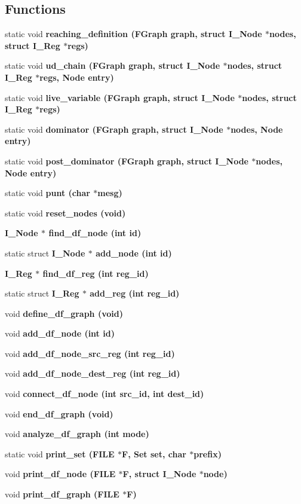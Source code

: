 \subsection*{Functions}
\begin{CompactItemize}
\item 
static void \bf{reaching\_\-definition} (\bf{FGraph} \bf{graph}, struct \bf{I\_\-Node} $\ast$\bf{nodes}, struct \bf{I\_\-Reg} $\ast$\bf{regs})
\item 
static void \bf{ud\_\-chain} (\bf{FGraph} \bf{graph}, struct \bf{I\_\-Node} $\ast$\bf{nodes}, struct \bf{I\_\-Reg} $\ast$\bf{regs}, \bf{Node} \bf{entry})
\item 
static void \bf{live\_\-variable} (\bf{FGraph} \bf{graph}, struct \bf{I\_\-Node} $\ast$\bf{nodes}, struct \bf{I\_\-Reg} $\ast$\bf{regs})
\item 
static void \bf{dominator} (\bf{FGraph} \bf{graph}, struct \bf{I\_\-Node} $\ast$\bf{nodes}, \bf{Node} \bf{entry})
\item 
static void \bf{post\_\-dominator} (\bf{FGraph} \bf{graph}, struct \bf{I\_\-Node} $\ast$\bf{nodes}, \bf{Node} \bf{entry})
\item 
static void \bf{punt} (char $\ast$mesg)
\item 
static void \bf{reset\_\-nodes} (void)
\item 
\bf{I\_\-Node} $\ast$ \bf{find\_\-df\_\-node} (int id)
\item 
static struct \bf{I\_\-Node} $\ast$ \bf{add\_\-node} (int id)
\item 
\bf{I\_\-Reg} $\ast$ \bf{find\_\-df\_\-reg} (int reg\_\-id)
\item 
static struct \bf{I\_\-Reg} $\ast$ \bf{add\_\-reg} (int reg\_\-id)
\item 
void \bf{define\_\-df\_\-graph} (void)
\item 
void \bf{add\_\-df\_\-node} (int id)
\item 
void \bf{add\_\-df\_\-node\_\-src\_\-reg} (int reg\_\-id)
\item 
void \bf{add\_\-df\_\-node\_\-dest\_\-reg} (int reg\_\-id)
\item 
void \bf{connect\_\-df\_\-node} (int src\_\-id, int dest\_\-id)
\item 
void \bf{end\_\-df\_\-graph} (void)
\item 
void \bf{analyze\_\-df\_\-graph} (int \bf{mode})
\item 
static void \bf{print\_\-set} (FILE $\ast$\bf{F}, \bf{Set} set, char $\ast$prefix)
\item 
void \bf{print\_\-df\_\-node} (FILE $\ast$\bf{F}, struct \bf{I\_\-Node} $\ast$\bf{node})
\item 
void \bf{print\_\-df\_\-graph} (FILE $\ast$\bf{F})
\end{CompactItemize}
